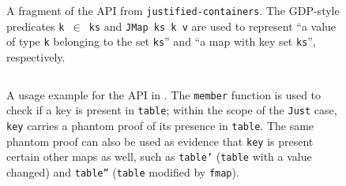 \documentclass[format=sigplan, review=false, screen=true]{acmart}
\begin{document}
\begin{figure}
  \inputminted{haskell}{justified.hs}
  \caption{A fragment of the API from \texttt{justified-containers}.
    The GDP-style predicates \texttt{k $\in$ ks} and \texttt{JMap ks k v} are used to represent
    ``a value of type \texttt{k} belonging to the set \texttt{ks}'' and ``a map with key set \texttt{ks}'',
    respectively. \label{justified-api}}
\end{figure}
\begin{figure}
  \inputminted{haskell}{justified-usage.hs}
  \caption{A usage example for the API in . The \texttt{member} function is used
    to check if a key is present in \texttt{table}; within the scope of the \texttt{Just} case, \texttt{key}
    carries a phantom proof of its presence in \texttt{table}. The same phantom proof can also be used as evidence that
    \texttt{key} is present certain other maps as well, such as \texttt{table'} (\texttt{table} with a
    value changed) and \texttt{table''} (\texttt{table} modified by \texttt{fmap}).} 
\end{figure}



\end{document}
